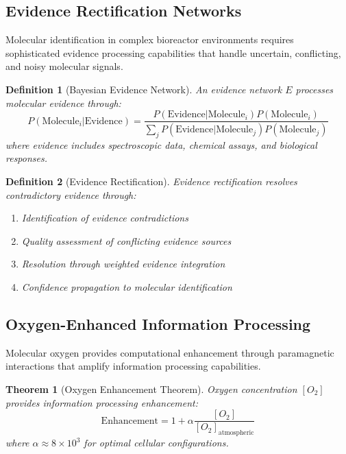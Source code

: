 \documentclass[12pt,a4paper]{article}
\newtheorem{theorem}{Theorem}
\newtheorem{definition}{Definition}
\begin{document}
\subsection{Evidence Rectification Networks}

Molecular identification in complex bioreactor environments requires sophisticated evidence processing capabilities that handle uncertain, conflicting, and noisy molecular signals.

\begin{definition}[Bayesian Evidence Network]
An evidence network $E$ processes molecular evidence through:
\begin{equation}
P(\text{Molecule}_i | \text{Evidence}) = \frac{P(\text{Evidence} | \text{Molecule}_i) P(\text{Molecule}_i)}{\sum_j P(\text{Evidence} | \text{Molecule}_j) P(\text{Molecule}_j)}
\end{equation}
where evidence includes spectroscopic data, chemical assays, and biological responses.
\end{definition}

\begin{definition}[Evidence Rectification]
Evidence rectification resolves contradictory evidence through:
\begin{enumerate}
\item Identification of evidence contradictions
\item Quality assessment of conflicting evidence sources
\item Resolution through weighted evidence integration
\item Confidence propagation to molecular identification
\end{enumerate}
\end{definition}

\subsection{Oxygen-Enhanced Information Processing}

Molecular oxygen provides computational enhancement through paramagnetic interactions that amplify information processing capabilities.

\begin{theorem}[Oxygen Enhancement Theorem]
Oxygen concentration $[O_2]$ provides information processing enhancement:
\begin{equation}
\text{Enhancement} = 1 + \alpha \frac{[O_2]}{[O_2]_{\text{atmospheric}}}
\end{equation}
where $\alpha \approx 8 \times 10^3$ for optimal cellular configurations.
\end{theorem}
\end{document}
